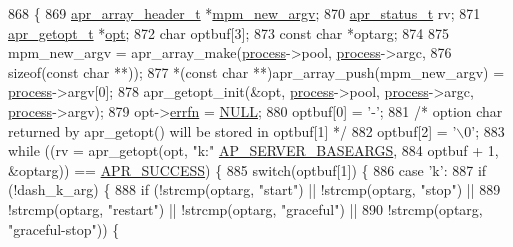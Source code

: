 \begin{DoxyCode}
868 \{
869     \hyperlink{structapr__array__header__t}{apr\_array\_header\_t} *\hyperlink{service_8c_a0d36510c15b5b9788dfc21bff6a8428f}{mpm\_new\_argv};
870     \hyperlink{group__apr__errno_gaa5105fa83cc322f09382292db8b47593}{apr\_status\_t} rv;
871     \hyperlink{structapr__getopt__t}{apr\_getopt\_t} *\hyperlink{group__apr__network__io_gac40a59a4a52d93ab3ec8dbbdf4d57e60}{opt};
872     \textcolor{keywordtype}{char} optbuf[3];
873     \textcolor{keyword}{const} \textcolor{keywordtype}{char} *optarg;
874 
875     mpm\_new\_argv = apr\_array\_make(\hyperlink{pcretest_8txt_a8ec73ad58a04604170bd96796a2075a8}{process}->pool, \hyperlink{pcretest_8txt_a8ec73ad58a04604170bd96796a2075a8}{process}->argc,
876                                   \textcolor{keyword}{sizeof}(\textcolor{keyword}{const} \textcolor{keywordtype}{char} **));
877     *(\textcolor{keyword}{const} \textcolor{keywordtype}{char} **)apr\_array\_push(mpm\_new\_argv) = \hyperlink{pcretest_8txt_a8ec73ad58a04604170bd96796a2075a8}{process}->argv[0];
878     apr\_getopt\_init(&opt, \hyperlink{pcretest_8txt_a8ec73ad58a04604170bd96796a2075a8}{process}->pool, \hyperlink{pcretest_8txt_a8ec73ad58a04604170bd96796a2075a8}{process}->argc, \hyperlink{pcretest_8txt_a8ec73ad58a04604170bd96796a2075a8}{process}->argv);
879     opt->\hyperlink{structapr__getopt__t_a6bf3fd7ad92d1f0161cd895e1ad50d06}{errfn} = \hyperlink{pcre_8txt_ad7f989d16aa8ca809a36bc392c07fba1}{NULL};
880     optbuf[0] = \textcolor{charliteral}{'-'};
881     \textcolor{comment}{/* option char returned by apr\_getopt() will be stored in optbuf[1] */}
882     optbuf[2] = \textcolor{charliteral}{'\(\backslash\)0'};
883     \textcolor{keywordflow}{while} ((rv = apr\_getopt(opt, \textcolor{stringliteral}{"k:"} \hyperlink{group__APACHE__CORE__MAIN_gae239400e72c98b1b05b6c656d36ee03c}{AP\_SERVER\_BASEARGS},
884                             optbuf + 1, &optarg)) == \hyperlink{group__apr__errno_ga9ee311b7bf1c691dc521d721339ee2a6}{APR\_SUCCESS}) \{
885         \textcolor{keywordflow}{switch}(optbuf[1]) \{
886         \textcolor{keywordflow}{case} \textcolor{charliteral}{'k'}:
887             \textcolor{keywordflow}{if} (!dash\_k\_arg) \{
888                 \textcolor{keywordflow}{if} (!strcmp(optarg, \textcolor{stringliteral}{"start"}) || !strcmp(optarg, \textcolor{stringliteral}{"stop"}) ||
889                     !strcmp(optarg, \textcolor{stringliteral}{"restart"}) || !strcmp(optarg, \textcolor{stringliteral}{"graceful"}) ||
890                     !strcmp(optarg, \textcolor{stringliteral}{"graceful-stop"})) \{

\end{DoxyCode}
